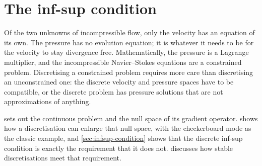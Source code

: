 \chapter{The inf-sup condition}\label{ch:infsup}
\chapterprecistoc{}


Of the two unknowns of incompressible flow, only the velocity has an equation of its own. The pressure has no evolution equation; it is whatever it needs to be for the velocity to stay divergence free. Mathematically, the pressure is a Lagrange multiplier, and the incompressible Navier--Stokes equations are a constrained problem. Discretising a constrained problem requires more care than discretising an unconstrained one: the discrete velocity and pressure spaces have to be compatible, or the discrete problem has pressure solutions that are not approximations of anything.

 sets out the continuous problem and the null space of its gradient operator.  shows how a discretisation can enlarge that null space, with the checkerboard mode as the classic example, and \cref{sec:infsup-condition} shows that the discrete inf-sup condition is exactly the requirement that it does not.  discusses how stable discretisations meet that requirement.


